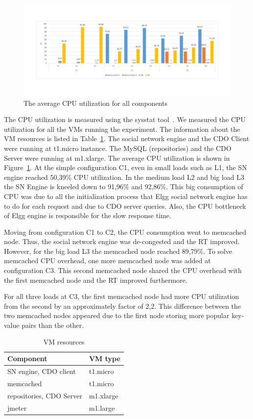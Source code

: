 \begin{figure}[h]
	\centering
	\includegraphics[width=1.1\textwidth]{./fig/UsageAVG.pdf} 
	\caption{The average CPU utilization for all components}
	\label{fig:cpuavg}
\end{figure}

The CPU utilization is measured using the sysstat tool~\cite{sysstat_url}. We measured the CPU utilization for all the VMs running the experiment. The information about the VM resources is listed in Table~\ref{vms_resources}. The social network engine and the CDO Client were running at t1.micro instance. The MySQL (repositories) and the CDO Server were running at m1.xlarge. The average CPU utilization is shown in Figure~\ref{fig:cpuavg}. At the simple configuration C1, even in small loads such as L1, the SN engine reached 50,39\% CPU utilization. In the medium load L2 and big load L3 the SN Engine is kneeled down to 91,96\% and 92,86\%. This big consumption of CPU was due to all the initialization process that Elgg social network engine has to do for each request and due to CDO server queries. Also, the CPU bottleneck of Elgg engine is responsible for the slow response time.

Moving from configuration C1 to C2, the CPU consumption went to memcached node. Thus, the social network engine was de-congested and the RT improved. However, for the big load L3 the memcached node reached 89,79\%. To solve memcached CPU overhead, one more memcached node was added at configuration C3. This second memcached node shared the CPU overhead with the first memcached node and the RT improved furthermore. 

For all three loads at C3, the first memcached node had more CPU utilization from the second by an approximately factor of 2,2. This difference between the two memcached nodes appeared due to the first node storing more popular key-value pairs than the other.

\begin{table}[]
\centering
\begin{tabular}{|l|l|}
\hline
 Component &  VM type \\ \hline
 SN engine, CDO client &  t1.micro \\ \hline
 memcached &  t1.micro \\ \hline
 repositories, CDO Server &  m1.xlarge \\ \hline
 jmeter &  m1.large \\ \hline
\end{tabular}
\caption{VM resources}
\label{vms_resources}
\end{table}


